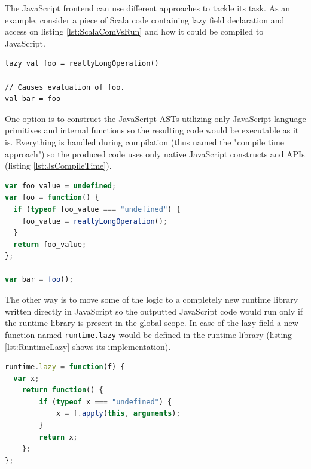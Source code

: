 \documentclass[12pt,a4paper]{report}
\begin{document}
The JavaScript frontend can use different approaches to tackle its task. As an example, consider a piece of Scala code containing lazy field declaration and access on listing \ref{lst:ScalaComVsRun} and how it could be compiled to JavaScript.

\begin{minipage}{\linewidth}
\begin{lstlisting}[caption={Lazy field declaration and access.},label={lst:ScalaComVsRun}]
lazy val foo = reallyLongOperation()

// Causes evaluation of foo.
val bar = foo 
\end{lstlisting}
\end{minipage}

One option is to construct the JavaScript ASTs utilizing only JavaScript language primitives and internal functions so the resulting code would be executable as it is. Everything is handled during compilation (thus named the "compile time approach") so the produced code uses only native JavaScript constructs and APIs (listing \ref{lst:JsCompileTime}).

\begin{minipage}{\linewidth}
\begin{lstlisting}[language=JavaScript,caption={Compile time option outcome.},label={lst:JsCompileTime}]
var foo_value = undefined;
var foo = function() {
  if (typeof foo_value === "undefined") {
    foo_value = reallyLongOperation();
  }
  return foo_value;
};

var bar = foo();
\end{lstlisting} 
\end{minipage}

The other way is to move some of the logic to a completely new runtime library written directly in JavaScript so the outputted JavaScript code would run only if the runtime library is present in the global scope. In case of the lazy field a new function named \texttt{runtime.lazy} would be defined in the runtime library (listing \ref{lst:RuntimeLazy} shows its implementation).

\begin{minipage}{\linewidth}
\begin{lstlisting}[language=JavaScript,caption={Runtime function that lazifies evaluation.},label={lst:RuntimeLazy}]
runtime.lazy = function(f) {
  var x;
	return function() {
		if (typeof x === "undefined") {
			x = f.apply(this, arguments);
		}
		return x;
	};
};
\end{lstlisting}
\end{minipage}
\end{document}
